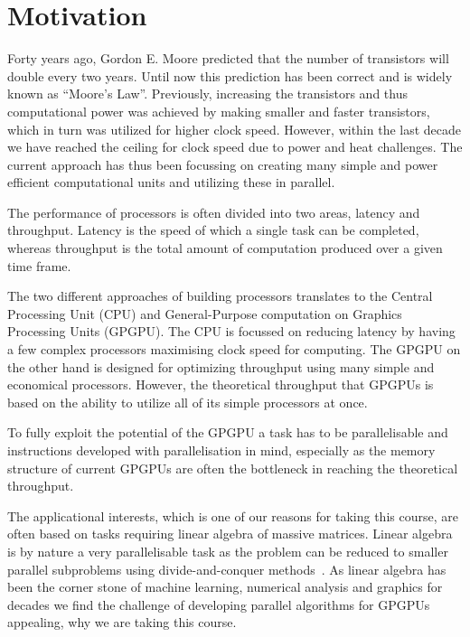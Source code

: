 ﻿\section{Motivation}
\label{sec:motivation}

Forty years ago, Gordon E. Moore predicted that the number of transistors will double every two years. Until now this prediction has been correct and is widely known as ``Moore's Law''. Previously, increasing the transistors and thus computational power was achieved by making smaller and faster transistors, which in turn was utilized for higher clock speed. However, within the last decade we have reached the ceiling for clock speed due to power and heat challenges. The current approach has thus been focussing on creating many simple and power efficient computational units and utilizing these in parallel.~\cite{udacity, schaller1997moore,bryant2003computer}

The performance of processors is often divided into two areas, latency and throughput. Latency is the speed of which a single task can be completed, whereas throughput is the total amount of computation produced over a given time frame.~\cite{farber2011cuda}

The two different approaches of building processors translates to the Central Processing Unit (CPU) and General-Purpose computation on Graphics Processing Units  (GPGPU). The CPU is focussed on reducing latency by having a few complex processors maximising clock speed for computing. The GPGPU on the other hand is designed for optimizing throughput using many simple and economical processors. However, the theoretical throughput that GPGPUs is based on the ability to utilize all of its simple processors at once.

To fully exploit the potential of the GPGPU a task has to be parallelisable and instructions developed with parallelisation in mind, especially as the memory structure of current GPGPUs are often the bottleneck in reaching the theoretical throughput.

The applicational interests, which is one of our reasons for taking this course, are often based on tasks requiring linear algebra of massive matrices. Linear algebra is by nature a very parallelisable task as the problem can be reduced to smaller parallel subproblems using divide-and-conquer methods~\cite{amdahlorgustafson2011,chen2014data}. As linear algebra has been the corner stone of machine learning, numerical analysis and graphics for decades we find the challenge of developing parallel algorithms for GPGPUs appealing, why we are taking this course.
